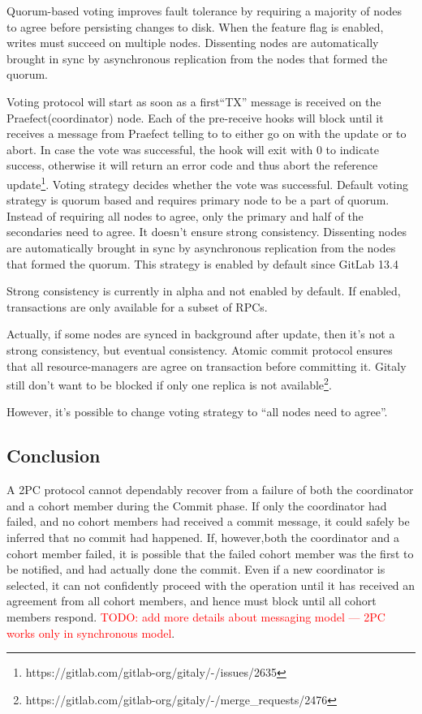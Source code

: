 \documentclass[sigplan, screen, nonacm, 11pt]{acmart}
\newcommand{\todo}[1]{\textcolor{red}{TODO: #1}}
\begin{document}
Quorum-based voting improves fault tolerance by requiring a majority of nodes to agree before persisting changes to disk.
When the feature flag is enabled, writes must succeed on multiple nodes.
Dissenting nodes are automatically brought in sync by asynchronous replication from the nodes that formed the quorum.

Voting protocol will start as soon as a first``TX'' message is received on the Praefect(coordinator) node.
Each of the pre-receive hooks will block until it receives a message from Praefect telling to to either go on with the update or to abort.
In case the vote was successful, the hook will exit with 0 to indicate success, otherwise it will return an error code and thus abort the reference update\footnote{https://gitlab.com/gitlab-org/gitaly/-/issues/2635}.
Voting strategy decides whether the vote was successful.
Default voting strategy is quorum based and requires primary node to be a part of quorum.
Instead of requiring all nodes to agree, only the primary and half of the secondaries need to agree.
It doesn't ensure strong consistency.
Dissenting nodes are automatically brought in sync by asynchronous replication from the nodes that formed the quorum.
This strategy is enabled by default since GitLab 13.4

Strong consistency is currently in alpha and not enabled by default.
If enabled, transactions are only available for a subset of RPCs.

Actually, if some nodes are synced in background after update, then it's not a strong consistency, but eventual consistency.
Atomic commit protocol ensures that all resource-managers are agree on transaction before committing it.
Gitaly still don't want to be blocked if only one replica is not available\footnote{https://gitlab.com/gitlab-org/gitaly/-/merge\_requests/2476}.

However, it's possible to change voting strategy to ``all nodes need to agree''.


\subsection{Conclusion}

A 2PC protocol cannot dependably recover from a failure of both the coordinator and a cohort member during the Commit phase.
If only the coordinator had failed, and no cohort members had received a commit message, it could safely be inferred
that no commit had happened.
If, however,both the coordinator and a cohort member failed, it is possible that the failed cohort member was the first
to be notified, and had actually done the commit.
Even if a new coordinator is selected, it can not confidently proceed with the operation until it has received
an agreement from all cohort members, and hence must block until all cohort members respond.
\todo{add more details about messaging model --- 2PC works only in synchronous model}.
\end{document}
